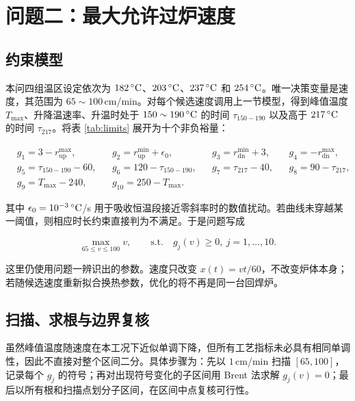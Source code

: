 \section{问题二：最大允许过炉速度}

\subsection{约束模型}

本问四组温区设定依次为 $182\,^{\circ}\mathrm{C}$、$203\,^{\circ}\mathrm{C}$、$237\,^{\circ}\mathrm{C}$ 和 $254\,^{\circ}\mathrm{C}$。唯一决策变量是速度，其范围为 $65\sim100\,$cm/min。对每个候选速度调用上一节模型，得到峰值温度 $T_{\max}$、升降温速率、升温时处于 $150\sim190\,^{\circ}\mathrm{C}$ 的时间 $\tau_{150-190}$ 以及高于 $217\,^{\circ}\mathrm{C}$ 的时间 $\tau_{217}$。将表 \ref{tab:limits} 展开为十个非负裕量：

\begin{equation}
\begin{aligned}
  &g_1=3-r_{\mathrm{up}}^{\max}, &&g_2=r_{\mathrm{up}}^{\min}+\epsilon_0,
  &&g_3=r_{\mathrm{dn}}^{\min}+3, &&g_4=-r_{\mathrm{dn}}^{\max},\\
  &g_5=\tau_{150-190}-60, &&g_6=120-\tau_{150-190},
  &&g_7=\tau_{217}-40, &&g_8=90-\tau_{217},\\
  &g_9=T_{\max}-240, &&g_{10}=250-T_{\max}.&&&&
\end{aligned}
\label{eq:margins}
\end{equation}

其中 $\epsilon_0=10^{-3}\,^{\circ}\mathrm{C}$/s 用于吸收恒温段接近零斜率时的数值扰动。若曲线未穿越某一阈值，则相应时长约束直接判为不满足。于是问题写成

\begin{equation}
  \max_{65\le v\le100}v,
  \qquad \text{s.t.}\quad g_j(v)\ge0,\ j=1,\ldots,10.
  \label{eq:q2}
\end{equation}

这里仍使用问题一辨识出的参数。速度只改变 $x(t)=vt/60$，不改变炉体本身；若随候选速度重新拟合换热参数，优化的将不再是同一台回焊炉。

\subsection{扫描、求根与边界复核}

虽然峰值温度随速度在本工况下近似单调下降，但所有工艺指标未必具有相同单调性，因此不直接对整个区间二分。具体步骤为：先以 $1\,$cm/min 扫描 $[65,100]$，记录每个 $g_j$ 的符号；再对出现符号变化的子区间用 Brent 法求解 $g_j(v)=0$；最后以所有根和扫描点划分子区间，在区间中点复核可行性。

